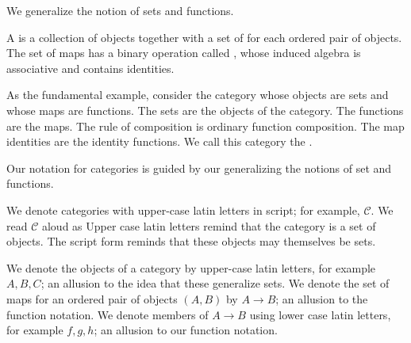 
\sbasic









\sstart
{}


We generalize the notion of sets and functions.


A  is a collection of
objects together with a set of
 for each
ordered pair of objects.
The set of maps has a binary operation called
,
whose induced algebra is associative and contains identities.

As the fundamental example, consider the category whose
objects are sets and whose maps are functions.
The sets are the objects of the category.
The functions are the maps.
The rule of composition is ordinary function composition.
The map identities are the identity functions.
We call this category the .


Our notation for categories is guided by our generalizing the notions of set and functions.

We denote categories with upper-case latin letters
in script; for example, $\mathcal{C}$.
We read $\mathcal{C}$ aloud as 
Upper case latin letters remind that the category is a set of objects.
The script form reminds that these objects may themselves be sets.

We denote the objects of a category by upper-case latin letters,
for example $A, B, C$; an allusion to the idea that these generalize sets.
We denote the set of maps for an ordered pair of objects $(A, B)$
by $A \to B$; an allusion to the function notation.
We denote members of $A \to B$  using lower case latin letters,
for example $f, g, h$; an allusion to our function notation.
\strats
